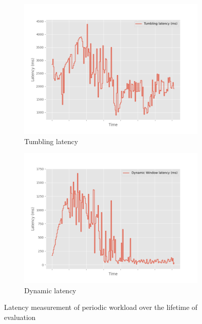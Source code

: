 \begin{figure}
    \begin{subfigure}[b]{0.5\textwidth}
        \includegraphics[width=\textwidth]{fig/periodic/Tumbling_latency_lineplot.png}
        \caption{Tumbling latency }
        \label{fig:periodic_tumbling_lineplot}
    \end{subfigure}
    \hfill
    \begin{subfigure}[b]{0.5\textwidth}
        \includegraphics[width=\textwidth]{fig/periodic/DynamicWindow_latency_lineplot.png}
        \caption{Dynamic latency }
        \label{fig:periodic_dynamic_lineplot}
    \end{subfigure}
    \caption{Latency measurement of periodic workload over the lifetime of evaluation}
    \label{fig:periodic_latency_lineplot}
\end{figure}


